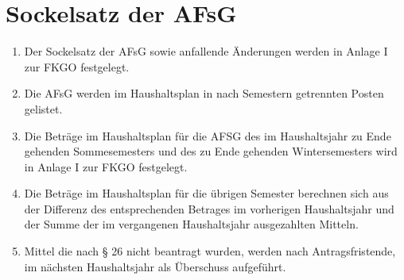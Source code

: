 \documentclass{article}
\begin{document}
\section{Sockelsatz der AFsG}
\begin{enumerate}[(1)]
    \item Der Sockelsatz der AFsG sowie anfallende Änderungen werden in Anlage I zur FKGO festgelegt.
    \item Die AFsG werden im Haushaltsplan in nach Semestern getrennten Posten gelistet.
	\item Die Beträge im Haushaltsplan für die AFSG des im Haushaltsjahr zu Ende gehenden Sommesemesters und des zu Ende gehenden Wintersemesters wird in Anlage I zur FKGO festgelegt.
	\item Die Beträge im Haushaltsplan für die übrigen Semester berechnen sich aus der Differenz des entsprechenden Betrages im vorherigen Haushaltsjahr und der Summe der im vergangenen Haushaltsjahr ausgezahlten Mitteln.
	\item Mittel die nach § 26 nicht beantragt wurden, werden nach Antragsfristende, im nächsten Haushaltsjahr als Überschuss aufgeführt.
\end{enumerate}
\end{document}
